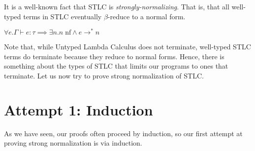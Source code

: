 \documentclass{lecturenotes}
\newcommand{\abs}[2]{\ensuremath{\lambda #1.\,#2}}
\newcommand{\app}[2]{\ensuremath{#1\;#2}}
\newcommand{\neutral}[1]{#1\;\text{ne}}
\newcommand{\nf}[1]{#1\;\text{nf}}
\newcommand{\proves}{\vdash}
\begin{document}

It is a well-known fact that STLC is \emph{strongly-normalizing}.
That is, that all well-typed terms in STLC eventually $\beta$-reduce to a normal form.

\begin{thm}
  \label{thm:strong-norm}
  $\forall e. \Gamma \proves e : \tau \implies \exists n. \nf{n} \land e \to^\ast n$
\end{thm}

Note that, while Untyped Lambda Calculus does not terminate, well-typed STLC terms do terminate because they reduce to normal forms.
Hence, there is something about the types of STLC that limits our programs to ones that terminate.
Let us now try to prove strong normalization of STLC.

\section{Attempt 1: Induction}

As we have seen, our proofs often proceed by induction, so our first attempt at proving strong normalization is via induction.
\end{document}
